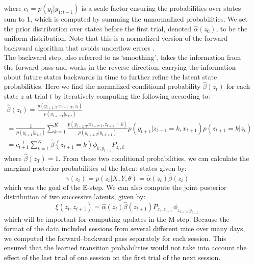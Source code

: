 where ${c_t} = p({y_t}|{y_{1:t - 1}})$ is a scale factor ensuring the probabilities over states sum to 1, which is computed by summing the unnormalized probabilities. We set the prior distribution over states before the first trial, denoted $\hat \alpha (z_0)$, to be the uniform distribution. Note that this is a normalized version of the forward–backward algorithm that avoids underflow errors \cite{bishop_pattern_2006}.  \\
The backward step, also referred to as ‘smoothing’, takes the information from the forward pass and works in the reverse direction, carrying the information about future states backwards in time to further refine the latent state probabilities. Here we find the normalized conditional probability $\hat \beta \left( {z_t} \right)$ for each state $z$ at trial $t$ by iteratively computing the following according to: 
\begin{equation}
\label{eq:m11}
    \begin{array}{c}\hat \beta \left( {z_t} \right) = \frac{{p(y_{t + 1:T}|x_{t + 1:T},z_t)}}{{p(y_{t + 1:T}|y_{1:t})}}\\ = \frac{1}{{p\left( {y_{t + 1}{{{\mathrm{|}}}}y_{1:t}} \right)}}\mathop {\sum }\limits_{k = 1}^K \frac{{p\left( {y_{t + 2:T}{{{\mathrm{|}}}}x_{t + 2:T},z_{t + 1} = k} \right)}}{{p\left( {y_{t + 2:T}{{{\mathrm{|}}}}y_{1:t + 1}} \right)}}p\left( {y_{t + 1}{{{\mathrm{|}}}}z_{t + 1} = k,x_{t + 1}} \right)p\left( {z_{t + 1} = k{{{\mathrm{|}}}}z_t} \right)\\ = c_{t + 1}^{ - 1}\mathop {\sum }\limits_{k = 1}^K \hat \beta \left( {z_{t + 1} = k} \right)\phi _{k,y_{t + 1}}P_{z_t,k}\end{array}
\end{equation}
where $\hat \beta \left( {z_T} \right) = 1$.
From these two conditional probabilities, we can calculate the marginal posterior probabilities of the latent states given by:
\begin{equation}
\label{eq:m12}
    \gamma \left( {z_t} \right) = p\left( {z_t{{{\mathrm{|}}}}X,Y,\theta } \right) = \hat \alpha (z_t)\hat \beta (z_t)
\end{equation}
which was the goal of the E-step. We can also compute the joint posterior distribution of two successive latents, given by:
\begin{equation}
\label{eq:m13}
    \xi (z_t,z_{t + 1}) = \hat \alpha \left( {z_t} \right)\hat \beta \left( {z_{t + 1}} \right)P_{z_t,z_{t + 1}}\phi _{z_{t + 1},y_{t + 1}}
\end{equation}
which will be important for computing updates in the M-step. Because the format of the data included sessions from several different mice over many days, we computed the forward–backward pass separately for each session. This ensured that the learned transition probabilities would not take into account the effect of the last trial of one session on the first trial of the next session. \\\\
